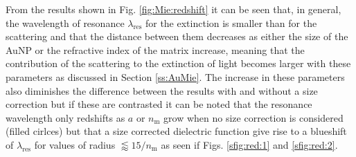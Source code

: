 From the results shown in Fig. \ref{fig:Mie:redshift} it can be seen that, in general, the wavelength of resonance  $\lambda_\text{res}$ for the extinction is smaller than for the scattering  and that the distance between them decreases as either the size of the AuNP or the refractive index of the matrix increase, meaning that the contribution of the scattering to the extinction of light becomes larger with these parameters as discussed in Section \ref{ss:AuMie}. The increase in these parameters also diminishes the difference between the results with and without a size correction but if these  are contrasted it can be noted that the resonance wavelength only redshifts as $a$ or $n_\text{m}$ grow when no size correction is considered (filled cirlces) but that a size corrected dielectric function give rise to a blueshift of $\lambda_\text{res}$ for values of radius $\lessapprox 15/n_\text{m}$ as seen if Figs. \ref{sfig:red:1} and \ref{sfig:red:2}.
